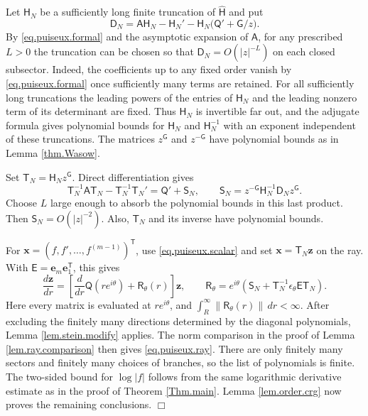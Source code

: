 \documentclass[a4paper,12pt]{article}
\newenvironment{proof}
{\noindent{\it Proof.}}{\hfill $\Box$\par\vspace{2.5mm}}
\numberwithin{equation}{section}
\begin{document}
\begin{proof}
Let $\mathsf H_N$ be a sufficiently long finite truncation of
$\widehat{\mathsf H}$ and put
\[
 \mathsf D_N
 =\mathsf A\mathsf H_N-\mathsf H_N'
  -\mathsf H_N\bigl(\mathsf Q'+\mathsf G/z\bigr).
\]
By \eqref{eq.puiseux.formal} and the asymptotic expansion of $\mathsf A$,
for any prescribed $L>0$ the truncation can be chosen so that
$\mathsf D_N=O(|z|^{-L})$ on each closed subsector.
Indeed, the coefficients up to any fixed order vanish by
\eqref{eq.puiseux.formal} once sufficiently many terms are retained.
For all sufficiently long truncations the leading powers of the entries
of $\mathsf H_N$ and the leading nonzero term of its determinant are fixed.
Thus $\mathsf H_N$ is invertible far out, and the adjugate formula gives
polynomial bounds for $\mathsf H_N$ and $\mathsf H_N^{-1}$ with an exponent
independent of these truncations. The matrices $z^{\mathsf G}$ and
$z^{-\mathsf G}$ have polynomial bounds as in Lemma \ref{thm.Wasow}.

Set $\mathsf T_N=\mathsf H_Nz^{\mathsf G}$. Direct differentiation gives
\begin{equation}\label{eq.puiseux.truncation}
 \mathsf T_N^{-1}\mathsf A\mathsf T_N
 -\mathsf T_N^{-1}\mathsf T_N'
 =\mathsf Q'+\mathsf S_N,
 \qquad
 \mathsf S_N=z^{-\mathsf G}\mathsf H_N^{-1}\mathsf D_Nz^{\mathsf G}.
\end{equation}
Choose $L$ large enough to absorb the polynomial bounds in this last
product. Then $\mathsf S_N=O(|z|^{-2})$.
Also, $\mathsf T_N$ and its inverse have polynomial bounds.

For $\bm x=(f,f',\ldots,f^{(m-1)})^{\mathsf T}$, use
\eqref{eq.puiseux.scalar} and set $\bm x=\mathsf T_N\bm z$ on the ray.
With $\mathsf E=\bm e_m\bm e_1^{\mathsf T}$, this gives
\[
 \frac{d\bm z}{dr}
 =\left[\frac{d}{dr}\mathsf Q(re^{i\theta})
       +\mathsf R_\theta(r)\right]\bm z,
 \qquad
 \mathsf R_\theta
 =e^{i\theta}\left(\mathsf S_N
       +\mathsf T_N^{-1}\epsilon_\theta\mathsf E\mathsf T_N\right).
\]
Here every matrix is evaluated at $re^{i\theta}$, and
$\int_R^\infty\|\mathsf R_\theta(r)\|\,dr<\infty$.
After excluding the finitely many directions determined by the diagonal
polynomials, Lemma \ref{lem.stein.modify} applies.
The norm comparison in the proof of Lemma \ref{lem.ray.comparison} then
gives \eqref{eq.puiseux.ray}.
There are only finitely many sectors and finitely many choices of branches,
so the list of polynomials is finite.
The two-sided bound for $\log|f|$ follows from the same logarithmic
derivative estimate as in the proof of Theorem \ref{Thm.main}.
Lemma \ref{lem.order.crg} now proves the remaining conclusions.
\end{proof}
\end{document}

